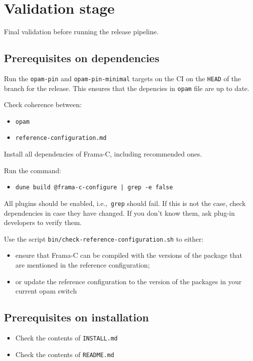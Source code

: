 \chapter{Validation stage}
\label{chap:validation}

Final validation before running the release pipeline.

\section{Prerequisites on dependencies}

Run the \texttt{opam-pin} and \texttt{opam-pin-minimal}
targets on the CI on the \texttt{HEAD} of the branch for the release.
This ensures that the depencies in \texttt{opam} file are up to date.

Check coherence between:
\begin{itemize}
  \item \texttt{opam}
  \item \texttt{reference-configuration.md} 
\end{itemize}

Install all dependencies of Frama-C, including recommended ones.

Run the command:
\begin{itemize}
  \item \texttt{dune build @frama-c-configure | grep -e false}
\end{itemize}

All plugins should be enabled, i.e.,~\texttt{grep} should fail.
If this is not the case, check dependencies in case they have changed.
If you don't know them, ask plug-in developers to verify them.

Use the script \texttt{bin/check-reference-configuration.sh} to either:
\begin{itemize}
\item ensure that Frama-C can be compiled with the versions of the package
  that are mentioned in the reference configuration;
\item or update the reference configuration to the version of the packages
  in your current opam switch
\end{itemize}
\section{Prerequisites on installation}

\begin{itemize}
  \item Check the contents of \texttt{INSTALL.md} 
  \item Check the contents of \texttt{README.md} 
\end{itemize}

